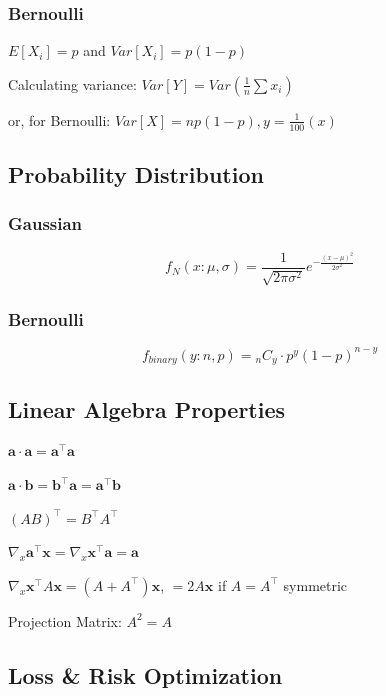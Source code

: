 \documentclass[8pt]{extarticle}
\begin{document}
\subsubsection*{Bernoulli}
$E[X_i] = p$ and $Var[X_i]=p(1-p)$\par
Calculating variance: $Var[Y]=Var(\frac{1}{n}\sum{x_i})$\par
or, for Bernoulli: $Var[X]=np(1-p), y=\frac{1}{100}(x)$\par
\hline


\subsection*{Probability Distribution}
\subsubsection*{Gaussian}
$$ f_N(x:\mu, \sigma)=\frac{1}{\sqrt{2\pi\sigma^2}}e^{-\frac{(x-\mu)^2}{2\sigma^2}} $$
\subsubsection*{Bernoulli}
$$ f_{binary}(y:n, p)= {_nC_y} \cdot p^y(1-p)^{n-y} $$ 
\hline

\subsection*{Linear Algebra Properties}
\begin{multicols}{2}
$\mathbf{a}\cdot \mathbf{a} = \mathbf{a}^\top \mathbf{a}$\par
$\mathbf{a}\cdot \mathbf{b} = \mathbf{b}^\top \mathbf{a} = \mathbf{a}^\top \mathbf{b}$\par
$(AB)^\top = B^\top A^\top$ \par
$\nabla_x \mathbf{a}^\top \mathbf{x} = \nabla_x \mathbf{x}^\top \mathbf{a} =\mathbf{a} $ \par
$\nabla_x \mathbf{x}^\top A\mathbf{x} = (A+A^\top)\mathbf{x}$, $=2A\mathbf{x}$ if $A=A^\top$ symmetric 
\end{multicols}

Projection Matrix: $A^2 = A$ \\
\hline

\subsection*{Loss \& Risk Optimization}
\end{document}
